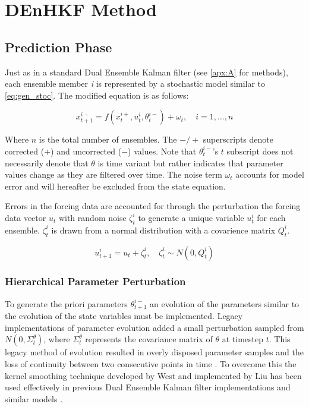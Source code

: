 \section{DEnHKF Method}

\subsection{Prediction Phase}

Just as in a standard Dual Ensemble Kalman filter (see \autoref{apx:A} for methods), each ensemble member \textit{i} is represented by a stochastic model similar to \eqref{eq:gen_stoc}. The modified equation is as follows:

\begin{equation}\label{eq:hdekf_predict}
x_{t+1}^{i-} = f(x_{t}^{i+}, u_{t}^{i}, \theta^{i-}_{t}) + \omega_{t}, \quad i=1,...,n
\end{equation}

Where $n$ is the total number of ensembles. The $-/+$ superscripts denote corrected ($+$) and uncorrected ($-$) values. Note that $\theta^{i-}_{t}$'s $t$ subscript does not necessarily denote that $\theta$ is time variant but rather indicates that parameter values change as they are filtered over time. The noise term $\omega_{t}$ accounts for model error and will hereafter be excluded from the state equation.

Errors in the forcing data are accounted for through the perturbation the forcing data vector $u_{t}$ with random noise $\zeta_{t}^{i}$ to generate a unique variable $u_{t}^{i}$ for each ensemble. $\zeta_{t}^{i}$ is drawn from a normal distribution with a covarience matrix $Q_{t}^{i}$.

\begin{equation}\label{eq:hdekf_u}
u_{t+1}^{i} = u_{t} + \zeta_{t}^{i}, \quad \zeta_{t}^{i} \sim N(0,Q_{t}^{i}) 
\end{equation}

\subsubsection{Hierarchical Parameter Perturbation}

To generate the priori parameters $\theta^{i-}_{t+1}$ an evolution of the parameters similar to the evolution of the state variables must be implemented. Legacy implementations of parameter evolution added a small perturbation sampled from $N(0,\Sigma^{\theta}_{t})$, where $\Sigma^{\theta}_{t}$ represents the covariance matrix of $\theta$ at timestep $t$. This legacy method of evolution resulted in overly disposed parameter samples and the loss of continuity between two consecutive points in time \cite{Liu2000} \cite{Chen2008}. To overcome this the kernel smoothing technique developed by West \cite{West1993} and implemented by Liu \cite{Liu2000} has been used effectively in previous Dual Ensemble Kalman filter implementations \cite{Moradkhani2005} and similar models \cite{Chen2008}.

